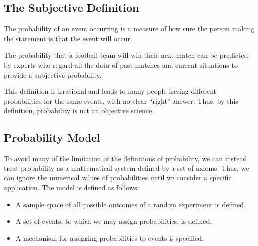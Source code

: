 \subsection*{The Subjective Definition}
The probability of an event occurring is a measure of how sure the person making the statement is that the event will occur.
\begin{example}
The probability that a football team will win their next match can be predicted by experts who regard all the data of past matches and current situations to provide a subjective probability.
\end{example}
\begin{info}
This definition is irrational and leads to many people having different probabilities for the same events, with no clear ``right'' answer. Thus, by this definition, probability is not an objective science.
\end{info}

\subsection*{Probability Model}
To avoid many of the limitation of the definitions of probability, we can instead treat probability as a mathematical system defined by a set of axioms. Thus, we can ignore the numerical values of probabilities until we consider a specific application. The model is defined as follows
\begin{itemize}
    \item A sample space of all possible outcomes of a random experiment is defined.
    \item A set of events, to which we may assign probabilities, is defined.
    \item A mechanism for assigning probabilities to events is specified.
\end{itemize}
